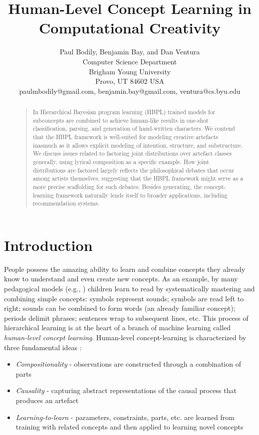 \documentclass[letterpaper]{article}
\title{Human-Level Concept Learning in Computational Creativity}
\author{Paul Bodily, Benjamin Bay, and Dan Ventura\\
Computer Science Department\\
Brigham Young University\\
Provo, UT 84602  USA\\
paulmbodily@gmail.com, benjamin.bay@gmail.com, ventura@cs.byu.edu\\
}
\begin{document}
 
\maketitle
\begin{abstract}
\begin{quote}
In Hierarchical Bayesian program learning (HBPL) trained models for subconcepts are combined to achieve human-like results in one-shot classification, parsing, and generation of hand-written characters. We contend that the HBPL framework is well-suited for modeling creative artefacts inasmuch as it allows explicit modeling of intention, structure, and substructure. We discuss issues related to factoring joint distributions over artefact classes generally, using lyrical composition as a specific example. How joint distributions are factored largely reflects the philosophical debates that occur among artists themselves, suggesting that the HBPL framework might serve as a more precise scaffolding for such debates. Besides generating, the concept-learning framework naturally lends itself to broader applications, including recommendation systems.
\end{quote}
\end{abstract}

\section{Introduction}

People possess the amazing ability to learn and combine concepts they already know to understand and even create new concepts. As an example, by many pedagogical models (e.g., \cite{englemann1974distar}) children learn to read by systematically mastering and combining simple concepts: symbols represent sounds; symbols are read left to right; sounds can be combined to form words (an already familiar concept); periods delimit phrases; sentences wrap to subsequent lines, etc. This process of hierarchical learning is at the heart of a branch of machine learning called \textit{human-level concept learning}. Human-level concept-learning is characterized by three fundamental ideas \cite{lake2015human}:

\begin{itemize}  
\item \emph{Compositionality} - observations are constructed through a combination of parts
\item \emph{Causality} - capturing abstract representations of the causal process that produces an artefact
\item \emph{Learning-to-learn} - parameters, constraints, parts, etc. are learned from training with related concepts and then applied to learning novel concepts
\end{itemize}
\end{document}

